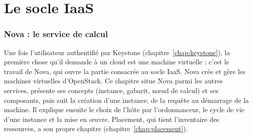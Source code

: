
\part{Le socle IaaS}\label{part:socle}

\section{Nova : le service de calcul}\label{chap:nova}

Une fois l'utilisateur authentifié par Keystone (chapitre~\ref{chap:keystone}), la première chose qu'il demande à un cloud est
une machine virtuelle : c'est le travail de Nova, qui ouvre la partie consacrée au socle IaaS. Nova crée et gère les machines
virtuelles d'OpenStack. Ce chapitre situe Nova parmi les autres services, présente ses concepts (instance, gabarit, nœud de
calcul) et ses composants, puis suit la création d'une instance, de la requête au démarrage de la machine. Il explique ensuite
le choix de l'hôte par l'ordonnanceur, le cycle de vie d'une instance et la mise en œuvre. Placement, qui tient l'inventaire des
ressources, a son propre chapitre (chapitre~\ref{chap:placement}).

